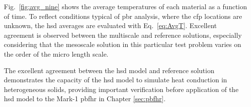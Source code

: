 Fig.\ \ref{fig:avg_nine} shows the average temperatures of each material as a function of time. To reflect conditions typical of \gls{pbr} analysis, where the \gls{cfp} locations are unknown, the \gls{hsd} averages are evaluated with Eq.\ \eqref{eq:AvgT}. Excellent agreement is observed between the multiscale and reference solutions, especially considering that the mesoscale solution in this particular test problem varies on the order of the micro length scale.

The excellent agreement between the \gls{hsd} model and reference solution demonstrates the capacity of the \gls{hsd} model to simulate heat conduction in heterogeneous solids, providing important verification before application of the \gls{hsd} model to the Mark-1 \gls{pbfhr} in Chapter \ref{sec:pbfhr}.